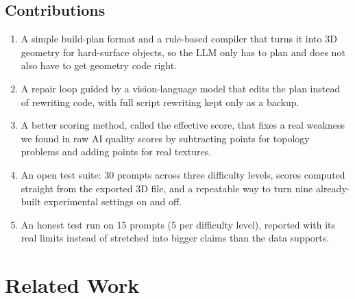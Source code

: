 \documentclass[conference]{IEEEtran}
\begin{document}
\subsection*{Contributions}
\begin{enumerate}
\item A simple build-plan format and a rule-based compiler that turns it into 3D geometry for hard-surface objects, so the LLM only has to plan and does not also have to get geometry code right.
\item A repair loop guided by a vision-language model that edits the plan instead of rewriting code, with full script rewriting kept only as a backup.
\item A better scoring method, called the effective score, that fixes a real weakness we found in raw AI quality scores by subtracting points for topology problems and adding points for real textures.
\item An open test suite: 30 prompts across three difficulty levels, scores computed straight from the exported 3D file, and a repeatable way to turn nine already-built experimental settings on and off.
\item An honest test run on 15 prompts (5 per difficulty level), reported with its real limits instead of stretched into bigger claims than the data supports.
\end{enumerate}

\section{Related Work}
\label{sec:related}
\end{document}
